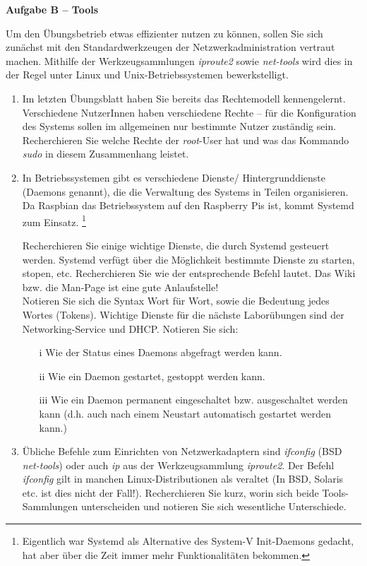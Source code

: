 \documentclass[paper=a4,fontsize=11pt]{scrartcl}%
\numberwithin{equation}{section}
\begin{document}
\begin{center}\Large{\textbf{Aufgabe B -- Tools}}\end{center}\vskip0.25in
Um den Übungsbetrieb etwas effizienter nutzen zu können, sollen Sie sich zunächst mit den Standardwerkzeugen der Netzwerkadministration vertraut machen. Mithilfe der Werkzeugsammlungen \emph{iproute2} sowie \emph{net-tools} wird dies in der Regel unter Linux und Unix-Betriebssystemen bewerkstelligt.
\begin{enumerate}
	\item Im letzten Übungsblatt haben Sie bereits das Rechtemodell kennengelernt. Verschiedene NutzerInnen haben verschiedene Rechte -- für die Konfiguration des Systems sollen im allgemeinen nur bestimmte Nutzer zuständig sein. Recherchieren Sie welche Rechte der \emph{root}-User hat und was das Kommando \emph{sudo} in diesem Zusammenhang leistet.
	\item In Betriebssystemen gibt es verschiedene Dienste/ Hintergrunddienste (Daemons genannt), die die Verwaltung des Systems in Teilen organisieren. Da Raspbian das Betriebssystem auf den Raspberry Pis ist, kommt Systemd zum Einsatz. \footnote{Eigentlich war Systemd als Alternative des System-V Init-Daemons gedacht, hat aber über die Zeit immer mehr Funktionalitäten bekommen.}
	\begin{tasks}
		\task Recherchieren Sie einige wichtige Dienste, die durch Systemd gesteuert werden.
		\task Systemd verfügt über die Möglichkeit bestimmte Dienste zu starten, stopen, etc. Recherchieren Sie wie der entsprechende Befehl lautet. Das Wiki bzw. die Man-Page ist eine gute Anlaufstelle!\\
		Notieren Sie sich die Syntax Wort für Wort, sowie die Bedeutung jedes Wortes (Tokens). 
		\task Wichtige Dienste für die nächste Laborübungen sind der Networking-Service und DHCP. Notieren Sie sich:
		\begin{itemize}
			\item[i] Wie der Status eines Daemons abgefragt werden kann.
			\item[ii] Wie ein Daemon gestartet, gestoppt werden kann.
			\item[iii] Wie ein Daemon permanent eingeschaltet bzw. ausgeschaltet werden kann (d.h. auch nach einem Neustart automatisch gestartet werden kann.)
		\end{itemize}
	\end{tasks}
	\item Übliche Befehle zum Einrichten von Netzwerkadaptern sind \emph{ifconfig} (BSD \emph{net-tools}) oder auch \emph{ip} aus der Werkzeugsammlung \emph{iproute2}. Der Befehl \emph{ifconfig} gilt in manchen Linux-Distributionen als veraltet (In BSD, Solaris etc. ist dies nicht der Fall!). Recherchieren Sie kurz, worin sich beide Tools-Sammlungen unterscheiden und notieren Sie sich wesentliche Unterschiede.\\

\end{enumerate}
\end{document}
